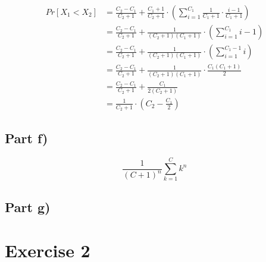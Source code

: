\documentclass[10pt,a4paper]{article}
\begin{document}
\begin{align*}
  Pr[X_{1} < X_{2}] & = \frac{C_{2} - C_{1}}{C_{2} + 1} + \frac{C_{1} + 1}{C_{2} + 1} \cdot \left( \sum_{i = 1}^{C_{1}} \frac{1}{C_{1} + 1} \cdot \frac{i - 1}{C_{1} + 1} \right)\\
                    & = \frac{C_{2} - C_{1}}{C_{2} + 1} + \frac{1}{(C_{2} + 1)(C_{1} + 1)} \cdot \left( \sum_{i = 1}^{C_{1}} i - 1 \right)\\
                    & = \frac{C_{2} - C_{1}}{C_{2} + 1} + \frac{1}{(C_{2} + 1)(C_{1} + 1)} \cdot \left( \sum_{i = 1}^{C_{1} - 1} i \right)\\
                    & = \frac{C_{2} - C_{1}}{C_{2} + 1} + \frac{1}{(C_{2} + 1)(C_{1} + 1)} \cdot \frac{C_{1}(C_{1} + 1)}{2}\\
                    & = \frac{C_{2} - C_{1}}{C_{2} + 1} + \frac{C_{1}}{2(C_{2} + 1)}\\
                    & = \frac{1}{C_{2} + 1} \cdot \left( C_{2} - \frac{C_{1}}{2} \right)
\end{align*}

\subsection*{Part f)}

\begin{equation*}
  \frac{1}{(C + 1)^{n}} \sum_{k = 1}^{C} k^{n}
\end{equation*}

\subsection*{Part g)}

\section*{Exercise 2}
\end{document}

